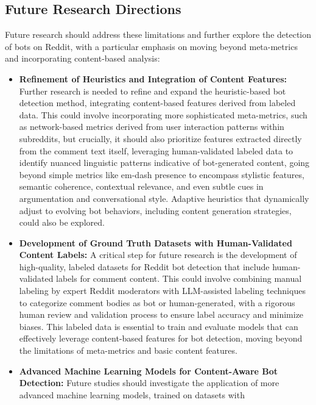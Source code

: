 \documentclass[
  12pt,
  letterpaper,
  DIV=11,
  numbers=noendperiod,
  abstract]{scrartcl}
\begin{document}
\subsection{Future Research
Directions}\label{future-research-directions}

Future research should address these limitations and further explore the
detection of bots on Reddit, with a particular emphasis on moving beyond
meta-metrics and incorporating content-based analysis:

\begin{itemize}
\item
  \textbf{Refinement of Heuristics and Integration of Content Features:}
  Further research is needed to refine and expand the heuristic-based
  bot detection method, integrating content-based features derived from
  labeled data. This could involve incorporating more sophisticated
  meta-metrics, such as network-based metrics derived from user
  interaction patterns within subreddits, but crucially, it should also
  prioritize features extracted directly from the comment text itself,
  leveraging human-validated labeled data to identify nuanced linguistic
  patterns indicative of bot-generated content, going beyond simple
  metrics like em-dash presence to encompass stylistic features,
  semantic coherence, contextual relevance, and even subtle cues in
  argumentation and conversational style. Adaptive heuristics that
  dynamically adjust to evolving bot behaviors, including content
  generation strategies, could also be explored.
\item
  \textbf{Development of Ground Truth Datasets with Human-Validated
  Content Labels:} A critical step for future research is the
  development of high-quality, labeled datasets for Reddit bot detection
  that include human-validated labels for comment content. This could
  involve combining manual labeling by expert Reddit moderators with
  LLM-assisted labeling techniques to categorize comment bodies as bot
  or human-generated, with a rigorous human review and validation
  process to ensure label accuracy and minimize biases. This labeled
  data is essential to train and evaluate models that can effectively
  leverage content-based features for bot detection, moving beyond the
  limitations of meta-metrics and basic content features.
\item
  \textbf{Advanced Machine Learning Models for Content-Aware Bot
  Detection:} Future studies should investigate the application of more
  advanced machine learning models, trained on datasets with

\end{itemize}
\end{document}
